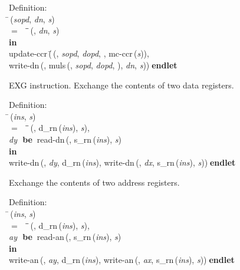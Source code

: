 \begin{tabbing}{\sc Definition}: \\  
\=\,({\it{sopd\/}}, {\it{dn\/}}, {\it{s\/}}) \\ 
$=$$\;\;\;\;$\=\=\,({}, {\it{dn\/}}, {\it{s\/}})\- \\ 
{\bf in} \\ 
{\rm{update-ccr}}\,(\=\,({}, {\it{sopd\/}}, {\it{dopd\/}}, {}, {\rm{mc-ccr}}\,({\it{s\/}})), \\ 
{\rm{write-dn}}\,({}, {\rm{muls}}\,({}, {\it{sopd\/}}, {\it{dopd\/}}, {}), {\it{dn\/}}, {\it{s\/}}))\-$\;${\bf  endlet}\-\-
\end{tabbing}

 EXG instruction.
 Exchange the contents of two data registers.
\begin{tabbing}{\sc Definition}: \\  
\=\,({\it{ins\/}}, {\it{s\/}}) \\ 
$=$$\;\;\;\;$\=\=\,({}, {\rm{d\_rn}}\,({\it{ins\/}}), {\it{s\/}}), \\ 
{\it{dy\/}}{\bf $\;$ be$\;\;$}{\rm{read-dn}}\,({}, {\rm{s\_rn}}\,({\it{ins\/}}), {\it{s\/}})\- \\ 
{\bf in} \\ 
{\rm{write-dn}}\,({}, {\it{dy\/}}, {\rm{d\_rn}}\,({\it{ins\/}}), {\rm{write-dn}}\,({}, {\it{dx\/}}, {\rm{s\_rn}}\,({\it{ins\/}}), {\it{s\/}}))$\;${\bf  endlet}\-\-
\end{tabbing}

 Exchange the contents of two address registers.
\begin{tabbing}{\sc Definition}: \\  
\=\,({\it{ins\/}}, {\it{s\/}}) \\ 
$=$$\;\;\;\;$\=\=\,({}, {\rm{d\_rn}}\,({\it{ins\/}}), {\it{s\/}}), \\ 
{\it{ay\/}}{\bf $\;$ be$\;\;$}{\rm{read-an}}\,({}, {\rm{s\_rn}}\,({\it{ins\/}}), {\it{s\/}})\- \\ 
{\bf in} \\ 
{\rm{write-an}}\,({}, {\it{ay\/}}, {\rm{d\_rn}}\,({\it{ins\/}}), {\rm{write-an}}\,({}, {\it{ax\/}}, {\rm{s\_rn}}\,({\it{ins\/}}), {\it{s\/}}))$\;${\bf  endlet}\-\-
\end{tabbing}

